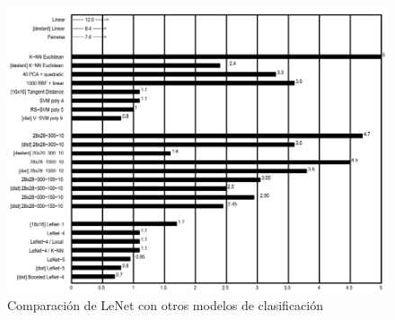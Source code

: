\begin{figure}[htbp]
    \centering
    \includegraphics[width=\linewidth]{src/figures/lenet_comparison.png}
    \caption{Comparación de LeNet con otros modelos de clasificación \cite{lecun_comparison_image}}
    \label{fig:lenet_comparison}
\end{figure}

